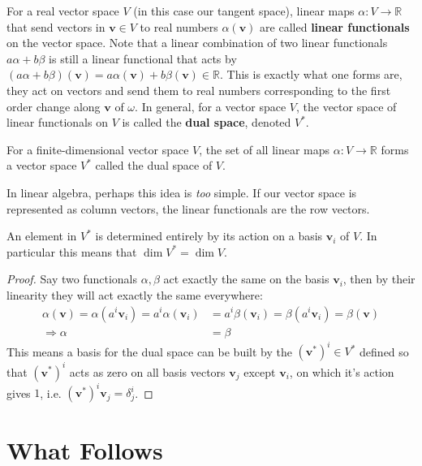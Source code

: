 \documentclass[../master.tex]{subfiles}
\begin{document}
	For a real vector space $V$ (in this case our tangent space), linear maps $\alpha: V \rightarrow \mathbb R$ that send vectors in $\mathbf v \in V$ to real numbers $\alpha(\mathbf v)$ are called \textbf{linear functionals} on the vector space. Note that a linear combination of two linear functionals $a \alpha + b \beta$ is still a linear functional that acts by $(a \alpha + b \beta)(\mathbf v) = a \alpha(\mathbf v) + b \beta(\mathbf v) \in \mathbb R$. This is exactly what one forms are, they act on vectors and send them to real numbers corresponding to the first order change along $\mathbf v$ of $\omega$. In general, for a vector space $V$, the vector space of linear functionals on $V$ is called the \textbf{dual space}, denoted $V^*$.
	\begin{defn}
		For a finite-dimensional vector space $V$, the set of all linear maps $\alpha: V \rightarrow \mathbb R$ forms a vector space $V^*$ called the dual space of $V$. 
	\end{defn}
	
	In linear algebra, perhaps this idea is \emph{too} simple. If our vector space is represented as column vectors, the linear functionals are the row vectors.
	
	\begin{prop}
		An element in $V^*$ is determined entirely by its action on a basis $\mathbf v_i$ of $V$. In particular this means that $\dim V^* = \dim V$.
	\end{prop}
	\begin{proof}
		Say two functionals $\alpha, \beta$ act exactly the same on the basis $\mathbf v_i$, then by their linearity they will act exactly the same everywhere: 
		\begin{align*}
			\alpha(\mathbf v)= \alpha(a^i \mathbf v_i) = a^i \alpha(\mathbf v_i) &= a^i \beta(\mathbf v_i)= \beta(a^i \mathbf v_i) = \beta(\mathbf v)\\
			\Rightarrow \alpha &= \beta
		\end{align*}
		This means a basis for the dual space can be built by the $(\mathbf v^*)^i \in V^*$ defined so that $(\mathbf v^*)^i$ acts as zero on all basis vectors $\mathbf v_j$ except $\mathbf v_i$, on which it's action gives $1$, i.e. $(\mathbf v^*)^i \mathbf v_j = \delta^i_j$. 
	\end{proof}
	
	\section{What Follows} %
	\label{sec:what_follows}
\end{document}
